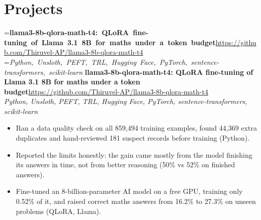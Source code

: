 \documentclass[a4paper,11pt]{article}
\newcommand{\project}[3]{%
  \textbf{#1}\hfill#3\\ {\color{muted}\small\textit{#2}}\par}
\begin{document}
\section{Projects}
=\hbox{\textbf{llama3-8b-qlora-math-t4: QLoRA fine-tuning of Llama 3.1 8B for maths under a token budget}\hspace{1em}\url{https://github.com/Thiruvel-AP/llama3-8b-qlora-math-t4}}%
=\hbox{{\small\textit{Python, Unsloth, PEFT, TRL, Hugging Face, PyTorch, sentence-transformers, scikit-learn}}}%
\ifdim\wd0>\linewidth
\ifdim\wd2>\linewidth
\textbf{llama3-8b-qlora-math-t4: QLoRA fine-tuning of Llama 3.1 8B for maths under a token budget}\\ {\color{muted}\small\textit{Python, Unsloth, PEFT, TRL, Hugging Face, PyTorch, sentence-transformers, scikit-learn}}\\ \hspace*{\fill}{\small\url{https://github.com/Thiruvel-AP/llama3-8b-qlora-math-t4}}\par
\else
\textbf{llama3-8b-qlora-math-t4: QLoRA fine-tuning of Llama 3.1 8B for maths under a token budget}\\ {\color{muted}\small\textit{Python, Unsloth, PEFT, TRL, Hugging Face, PyTorch, sentence-transformers, scikit-learn}}\hfill{\small\url{https://github.com/Thiruvel-AP/llama3-8b-qlora-math-t4}}\par
\fi
\else
\project{llama3-8b-qlora-math-t4: QLoRA fine-tuning of Llama 3.1 8B for maths under a token budget}{Python, Unsloth, PEFT, TRL, Hugging Face, PyTorch, sentence-transformers, scikit-learn}{\url{https://github.com/Thiruvel-AP/llama3-8b-qlora-math-t4}}
\fi
\begin{itemize}
  \item Ran a data quality check on all 859,494 training examples, found 44,369 extra duplicates and hand-reviewed 181 suspect records before training (Python).
  \item Reported the limits honestly: the gain came mostly from the model finishing its answers in time, not from better reasoning (50\% vs 52\% on finished answers).
  \item Fine-tuned an 8-billion-parameter AI model on a free GPU, training only 0.52\% of it, and raised correct maths answers from 16.2\% to 27.3\% on unseen problems (QLoRA, Llama).
\end{itemize}
\end{document}
